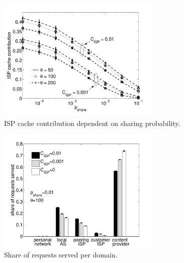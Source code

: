 \begin{figure}[tb]
  \centering
  \includegraphics[width=0.7\textwidth]{hierarchical/simulative/figures/ISPcontrib3}
  \caption{ISP cache contribution dependent on sharing probability.}
  \label{fig:ISPcontrib}
\end{figure}

\begin{figure}[tb]
  \centering
  \includegraphics[width=0.7\textwidth]{hierarchical/simulative/figures/RBHall3}
  \caption{Share of requests served per domain.}
  \label{fig:RBHall}
\end{figure}


